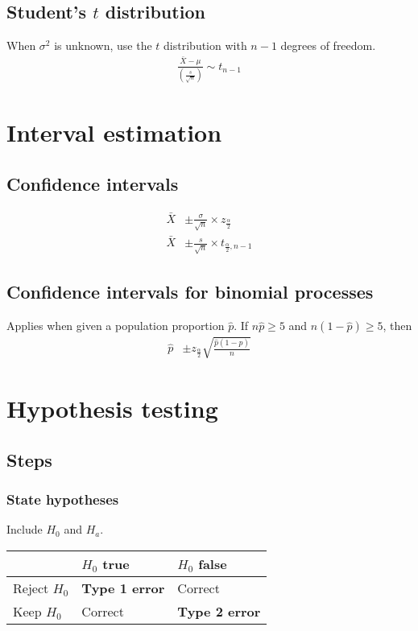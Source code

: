 \documentclass{article}
\newcommand{\soft}[1]{\left( #1 \right)}
\begin{document}
\begin{multicols*}{2}
\subsection{Student's $t$ distribution}
When $\sigma^2$ is unknown, use the $t$ distribution with $n - 1$ degrees of freedom.
\begin{align*}
    \frac{\bar{X} - \mu}{\soft{\frac{s}{\sqrt{n}}}} \sim t_{n - 1}
\end{align*}

\section{Interval estimation}

\subsection{Confidence intervals}
\begin{align*}
    \bar{X} &\pm \frac{\sigma}{\sqrt{n}} \times z_{\frac{\alpha}{2}} \\
    \bar{X} &\pm \frac{s}{\sqrt{n}} \times t_{\frac{\alpha}{2}, n - 1}
\end{align*}

\subsection{Confidence intervals for binomial processes}
Applies when given a population proportion $\hat{p}$. If $n\hat{p} \geq 5$ and $n(1 - \hat{p}) \geq 5$, then
\begin{align*}
    \hat{p} &\pm z_{\frac{\alpha}{2}} \sqrt{\frac{\hat{p} (1 - \hat{p})}{n}}
\end{align*}

\section{Hypothesis testing}

\subsection{Steps}

\subsubsection{State hypotheses}
Include $H_0$ and $H_a$.
\begin{center}
    \begin{tabular}{|l|l|l|}
        \hline
                     & $H_0$ true            & $H_0$ false           \\ \hline
        Reject $H_0$ & \textbf{Type 1 error} & Correct               \\ \hline
        Keep $H_0$   & Correct               & \textbf{Type 2 error} \\ \hline
    \end{tabular}
\end{center}

\end{multicols*}
\end{document}

